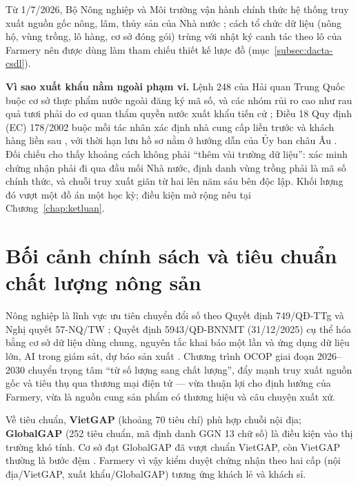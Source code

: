 Từ 1/7/2026, Bộ Nông nghiệp và Môi trường vận hành chính thức hệ thống truy xuất nguồn gốc nông, lâm, thủy sản của Nhà nước \parencite{traceviet_2026}; cách tổ chức dữ liệu (nông hộ, vùng trồng, lô hàng, cơ sở đóng gói) trùng với nhật ký canh tác theo lô của Farmery nên được dùng làm tham chiếu thiết kế lược đồ (mục~\ref{subsec:dacta-csdl}).

\label{subsec:nhatkycanhtac-xuatkhau}
\noindent\textbf{Vì sao xuất khẩu nằm ngoài phạm vi.} Lệnh 248 của Hải quan Trung Quốc buộc cơ sở thực phẩm nước ngoài đăng ký mã số, và các nhóm rủi ro cao như rau quả tươi phải do cơ quan thẩm quyền nước xuất khẩu tiến cử \parencite{gacc_decree248}; Điều 18 Quy định (EC) 178/2002 buộc mỗi tác nhân xác định nhà cung cấp liền trước và khách hàng liền sau \parencite{eu_gfl_178_2002}, với thời hạn lưu hồ sơ nằm ở hướng dẫn của Ủy ban châu Âu \parencite{ec_gfl_guidance}. Đối chiếu cho thấy khoảng cách không phải ``thêm vài trường dữ liệu'': xác minh chứng nhận phải đi qua đầu mối Nhà nước, định danh vùng trồng phải là mã số chính thức, và chuỗi truy xuất giãn từ hai lên năm sáu bên độc lập. Khối lượng đó vượt một đồ án một học kỳ; điều kiện mở rộng nêu tại Chương~\ref{chap:ketluan}.

\section{Bối cảnh chính sách và tiêu chuẩn chất lượng nông sản}
\label{sec:boicanhchinhsach}

Nông nghiệp là lĩnh vực ưu tiên chuyển đổi số theo Quyết định 749/QĐ-TTg \parencite{qd749_2020} và Nghị quyết 57-NQ/TW \parencite{nq57_tw}; Quyết định 5943/QĐ-BNNMT (31/12/2025) cụ thể hóa bằng cơ sở dữ liệu dùng chung, nguyên tắc khai báo một lần và ứng dụng dữ liệu lớn, AI trong giám sát, dự báo sản xuất \parencite{botnmt_2025, qd5943_2025}. Chương trình OCOP giai đoạn 2026--2030 chuyển trọng tâm ``từ số lượng sang chất lượng'', đẩy mạnh truy xuất nguồn gốc và tiêu thụ qua thương mại điện tử \parencite{danviet_2024_ocop, vietnamnet_2025_ocop} --- vừa thuận lợi cho định hướng của Farmery, vừa là nguồn cung sản phẩm có thương hiệu và câu chuyện xuất xứ.

Về tiêu chuẩn, \textbf{VietGAP} (khoảng 70 tiêu chí) phù hợp chuỗi nội địa; \textbf{GlobalGAP} (252 tiêu chuẩn, mã định danh GGN 13 chữ số) là điều kiện vào thị trường khó tính. Cơ sở đạt GlobalGAP đã vượt chuẩn VietGAP, còn VietGAP thường là bước đệm \parencite{vietgap_globalgap}. Farmery vì vậy kiểm duyệt chứng nhận theo hai cấp (nội địa/VietGAP, xuất khẩu/GlobalGAP) tương ứng khách lẻ và khách sỉ.

